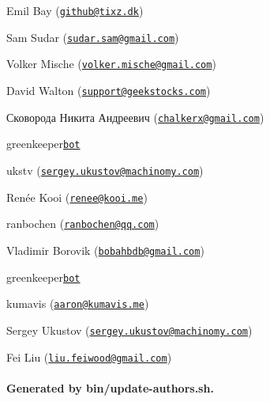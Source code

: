 \begin{DoxyItemize}
\item Emil Bay (\href{mailto:github@tixz.dk}{\tt github@tixz.\+dk})
\item Sam Sudar (\href{mailto:sudar.sam@gmail.com}{\tt sudar.\+sam@gmail.\+com})
\item Volker Mische (\href{mailto:volker.mische@gmail.com}{\tt volker.\+mische@gmail.\+com})
\item David Walton (\href{mailto:support@geekstocks.com}{\tt support@geekstocks.\+com})
\item Сковорода Никита Андреевич (\href{mailto:chalkerx@gmail.com}{\tt chalkerx@gmail.\+com})
\item greenkeeper\href{greenkeeper[bot]@users.noreply.github.com}{\tt bot}
\item ukstv (\href{mailto:sergey.ukustov@machinomy.com}{\tt sergey.\+ukustov@machinomy.\+com})
\item Renée Kooi (\href{mailto:renee@kooi.me}{\tt renee@kooi.\+me})
\item ranbochen (\href{mailto:ranbochen@qq.com}{\tt ranbochen@qq.\+com})
\item Vladimir Borovik (\href{mailto:bobahbdb@gmail.com}{\tt bobahbdb@gmail.\+com})
\item greenkeeper\href{23040076+greenkeeper[bot]@users.noreply.github.com}{\tt bot}
\item kumavis (\href{mailto:aaron@kumavis.me}{\tt aaron@kumavis.\+me})
\item Sergey Ukustov (\href{mailto:sergey.ukustov@machinomy.com}{\tt sergey.\+ukustov@machinomy.\+com})
\item Fei Liu (\href{mailto:liu.feiwood@gmail.com}{\tt liu.\+feiwood@gmail.\+com})
\end{DoxyItemize}

\paragraph*{Generated by bin/update-\/authors.\+sh.}